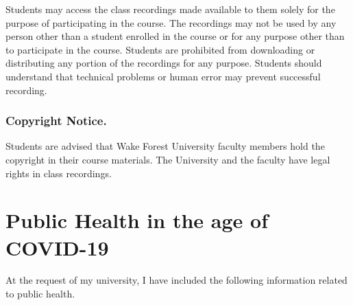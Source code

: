 \documentclass[
]{book}
\begin{document}
Students may access the class recordings made available to them solely for the purpose of participating in the course. The recordings may not be used by any person other than a student enrolled in the course or for any purpose other than to participate in the course. Students are prohibited from downloading or distributing any portion of the recordings for any purpose. Students should understand that technical problems or human error may prevent successful recording.

\hypertarget{copyright-notice.}{%
\subsection{Copyright Notice.}\label{copyright-notice.}}

Students are advised that Wake Forest University faculty members hold the copyright in their course materials. The University and the faculty have legal rights in class recordings.

\hypertarget{public-health-in-the-age-of-covid-19}{%
\chapter{Public Health in the age of COVID-19}\label{public-health-in-the-age-of-covid-19}}

At the request of my university, I have included the following information related to public health.
\end{document}
